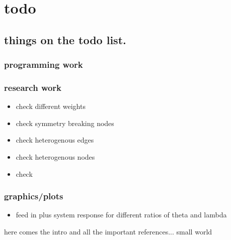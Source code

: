 \chapter{todo}

\section{things on the todo list.}

\subsection{programming work}

\subsection{research work}
\begin{itemize}
    \item check different weights
    \item check symmetry breaking nodes
    \item check heterogenous edges
    \item check heterogenous nodes
    \item check 
\end{itemize}

\subsection{graphics/plots}
\begin{itemize}
    \item feed in plus system response for different ratios of theta and lambda
\end{itemize}

here comes the intro and all the important references...
small world\cite{WAT98}